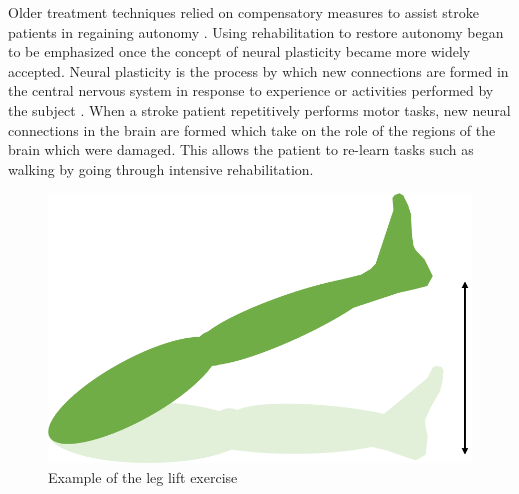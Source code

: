 \documentclass[12pt]{report}
\begin{document}

Older treatment techniques relied on compensatory measures to assist stroke patients in regaining autonomy \cite{Dobkin2004}. Using rehabilitation to restore autonomy began to be emphasized once the concept of neural plasticity became more widely accepted. Neural plasticity is the process by which new connections are formed in the central nervous system in response to experience or activities performed by the subject \cite{Warraich2010}. When a stroke patient repetitively performs motor tasks, new neural connections in the brain are formed which take on the role of the regions of the brain which were damaged. This allows the patient to re-learn tasks such as walking by going through intensive rehabilitation. 

	\begin{figure}[h] 
		\centering
		\includegraphics[width=0.6\linewidth]{leg_lift}
		\caption{Example of the leg lift exercise}
		\label{fig:leg_lift}
	\end{figure}
	
\end{document}
